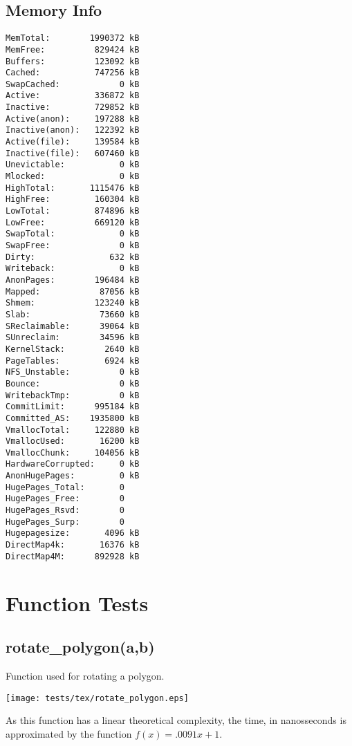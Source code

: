 \documentclass{article}
\begin{document}
\subsection{Memory Info}
\begin{verbatim}
MemTotal:        1990372 kB
MemFree:          829424 kB
Buffers:          123092 kB
Cached:           747256 kB
SwapCached:            0 kB
Active:           336872 kB
Inactive:         729852 kB
Active(anon):     197288 kB
Inactive(anon):   122392 kB
Active(file):     139584 kB
Inactive(file):   607460 kB
Unevictable:           0 kB
Mlocked:               0 kB
HighTotal:       1115476 kB
HighFree:         160304 kB
LowTotal:         874896 kB
LowFree:          669120 kB
SwapTotal:             0 kB
SwapFree:              0 kB
Dirty:               632 kB
Writeback:             0 kB
AnonPages:        196484 kB
Mapped:            87056 kB
Shmem:            123240 kB
Slab:              73660 kB
SReclaimable:      39064 kB
SUnreclaim:        34596 kB
KernelStack:        2640 kB
PageTables:         6924 kB
NFS_Unstable:          0 kB
Bounce:                0 kB
WritebackTmp:          0 kB
CommitLimit:      995184 kB
Committed_AS:    1935800 kB
VmallocTotal:     122880 kB
VmallocUsed:       16200 kB
VmallocChunk:     104056 kB
HardwareCorrupted:     0 kB
AnonHugePages:         0 kB
HugePages_Total:       0
HugePages_Free:        0
HugePages_Rsvd:        0
HugePages_Surp:        0
Hugepagesize:       4096 kB
DirectMap4k:       16376 kB
DirectMap4M:      892928 kB
\end{verbatim}
\section{Function Tests}
\subsection{rotate\_polygon(a,b)}
Function used for rotating a polygon.

\texttt{[image: tests/tex/rotate\_polygon.eps]}

As this function has a linear theoretical
complexity, the time, in nanosseconds is 
approximated by the function $f(x)=.0091x+1$.
\end{document}

